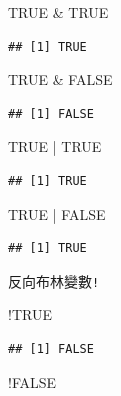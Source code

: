 \documentclass[]{book}
\newenvironment{Shaded}{\begin{snugshade}}{\end{snugshade}}
\newcommand{\StringTok}[1]{\textcolor[rgb]{0.31,0.60,0.02}{{#1}}}
\newcommand{\OtherTok}[1]{\textcolor[rgb]{0.56,0.35,0.01}{{#1}}}
\newcommand{\NormalTok}[1]{{#1}}
\theoremstyle{definition}
\theoremstyle{definition}
\theoremstyle{remark}
\begin{document}
\begin{Shaded}
\begin{Highlighting}[]
\OtherTok{TRUE} \NormalTok{&}\StringTok{ }\OtherTok{TRUE}
\end{Highlighting}
\end{Shaded}

\begin{verbatim}
## [1] TRUE
\end{verbatim}

\begin{Shaded}
\begin{Highlighting}[]
\OtherTok{TRUE} \NormalTok{&}\StringTok{ }\OtherTok{FALSE}
\end{Highlighting}
\end{Shaded}

\begin{verbatim}
## [1] FALSE
\end{verbatim}

\begin{Shaded}
\begin{Highlighting}[]
\OtherTok{TRUE} \NormalTok{|}\StringTok{ }\OtherTok{TRUE}
\end{Highlighting}
\end{Shaded}

\begin{verbatim}
## [1] TRUE
\end{verbatim}

\begin{Shaded}
\begin{Highlighting}[]
\OtherTok{TRUE} \NormalTok{|}\StringTok{ }\OtherTok{FALSE}
\end{Highlighting}
\end{Shaded}

\begin{verbatim}
## [1] TRUE
\end{verbatim}

反向布林變數\texttt{!}

\begin{Shaded}
\begin{Highlighting}[]
\NormalTok{!}\OtherTok{TRUE}
\end{Highlighting}
\end{Shaded}

\begin{verbatim}
## [1] FALSE
\end{verbatim}

\begin{Shaded}
\begin{Highlighting}[]
\NormalTok{!}\OtherTok{FALSE}
\end{Highlighting}
\end{Shaded}
\end{document}
